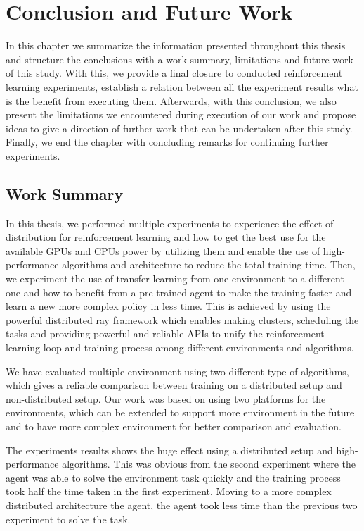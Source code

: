 
\chapter{Conclusion and Future Work}\label{chapter:conclusion_and_future_work}

In this chapter we summarize the information presented throughout this thesis and structure the conclusions with a work summary, limitations and future work of this study. With this, we provide a final closure to conducted reinforcement learning experiments, establish a relation between all the experiment results what is the benefit from executing them. Afterwards, with this conclusion, we also present the limitations we encountered during execution of our work and propose ideas to give a direction of further work that can be undertaken after this study. Finally, we end the chapter with concluding remarks for continuing further experiments.

\section{Work Summary}
In this thesis, we performed multiple experiments to experience the effect of distribution for reinforcement learning and how to get the best use for the available GPUs and CPUs power by utilizing them and enable the use of high-performance algorithms and architecture to reduce the total training time. Then, we experiment the use of transfer learning from one environment to a different one and how to benefit from a pre-trained agent to make the training faster and learn a new more complex policy in less time. This is achieved by using the powerful distributed ray framework which enables making clusters, scheduling the tasks and providing powerful and reliable APIs to unify the reinforcement learning loop and training process among different environments and algorithms. 

We have evaluated multiple environment using two different type of algorithms, which gives a reliable comparison between training on a distributed setup and non-distributed setup. Our work was based on using two platforms for the environments, which can be extended to support more environment in the future and to have more complex environment for better comparison and evaluation.

The experiments results shows the huge effect using a distributed setup and high-performance algorithms. This was obvious from the second experiment where the agent was able to solve the environment task quickly and the training process took half the time taken in the first experiment. Moving to a more complex distributed architecture the agent, the agent took less time than the previous two experiment to solve the task.

